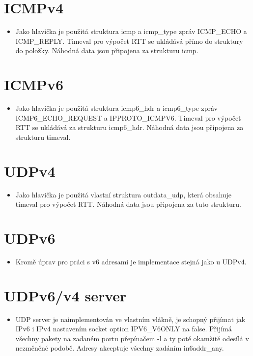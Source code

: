 \documentclass[a4paper,11pt]{article}
\begin{document}
\section*{ICMPv4}
\begin{itemize}
  \item Jako hlavička je použitá struktura icmp a icmp\_type zpráv ICMP\_ECHO a ICMP\_REPLY. Timeval pro výpočet RTT se ukládává přímo do struktury do položky. Náhodná data jsou připojena za strukturu icmp.
\end{itemize}

\section*{ICMPv6}
\begin{itemize}
  \item Jako hlavička je použitá struktura icmp6\_hdr a icmp6\_type zpráv ICMP6\_ECHO\_REQUEST a IPPROTO\_ICMPV6. Timeval pro výpočet RTT se ukládává za strukturu icmp6\_hdr. Náhodná data jsou připojena za strukturu timeval.
\end{itemize}

\section*{UDPv4}
\begin{itemize}
  \item Jako hlavička je použitá vlastní struktura outdata\_udp, která obsahuje timeval pro výpočet RTT. Náhodná data jsou připojena za tuto strukturu.
\end{itemize}

\section*{UDPv6}
\begin{itemize}
  \item Kromě úprav pro práci s v6 adresami je implementace stejná jako u UDPv4.
\end{itemize}

\section*{UDPv6/v4 server}
\begin{itemize}
  \item UDP server je naimplementován ve vlastním vlákně, je schopný přijímat jak IPv6 i IPv4 nastavením socket option IPV6\_V6ONLY na false. Přijímá všechny pakety na zadaném portu přepínačem -l
  a ty poté okamžitě odesílá v nezměněné podobě. Adresy akceptuje všechny zadáním in6addr\_any.
\end{itemize}
\end{document}
